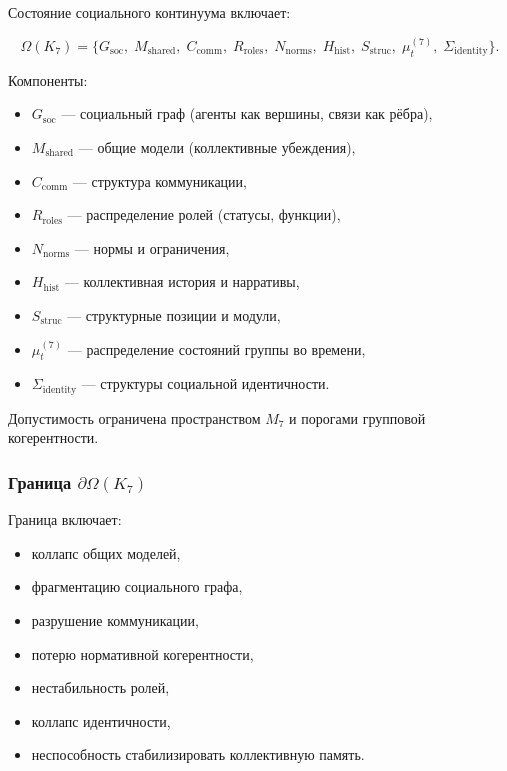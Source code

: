 Состояние социального континуума включает:

\[
\Omega(K_7)=
\{
G_{\mathrm{soc}},\;
M_{\mathrm{shared}},\;
C_{\mathrm{comm}},\;
R_{\mathrm{roles}},\;
N_{\mathrm{norms}},\;
H_{\mathrm{hist}},\;
S_{\mathrm{struc}},\;
\mu^{(7)}_t,\;
\Sigma_{\mathrm{identity}}
\}.
\]

Компоненты:
\begin{itemize}
    \item $G_{\mathrm{soc}}$ — социальный граф (агенты как вершины, связи как рёбра),
    \item $M_{\mathrm{shared}}$ — общие модели (коллективные убеждения),
    \item $C_{\mathrm{comm}}$ — структура коммуникации,
    \item $R_{\mathrm{roles}}$ — распределение ролей (статусы, функции),
    \item $N_{\mathrm{norms}}$ — нормы и ограничения,
    \item $H_{\mathrm{hist}}$ — коллективная история и нарративы,
    \item $S_{\mathrm{struc}}$ — структурные позиции и модули,
    \item $\mu^{(7)}_t$ — распределение состояний группы во времени,
    \item $\Sigma_{\mathrm{identity}}$ — структуры социальной идентичности.
\end{itemize}

Допустимость ограничена пространством $M_7$ и порогами групповой когерентности.

\subsubsection{Граница \texorpdfstring{$\partial\Omega(K_7)$}{\partial\Omega(K_7)}}

Граница включает:
\begin{itemize}
    \item коллапс общих моделей,
    \item фрагментацию социального графа,
    \item разрушение коммуникации,
    \item потерю нормативной когерентности,
    \item нестабильность ролей,
    \item коллапс идентичности,
    \item неспособность стабилизировать коллективную память.
\end{itemize}

